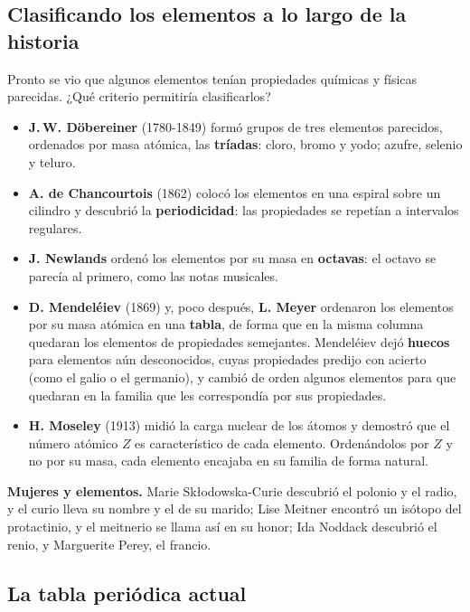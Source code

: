 \subsection{Clasificando los elementos a lo largo de la historia}

Pronto se vio que algunos elementos tenían propiedades químicas y físicas parecidas. ¿Qué criterio permitiría clasificarlos?
\begin{itemize}
    \item \textbf{J.\,W. Döbereiner} (1780-1849) formó grupos de tres elementos parecidos, ordenados por masa atómica, las
    \textbf{tríadas}: cloro, bromo y yodo; azufre, selenio y teluro.
    \item \textbf{A. de Chancourtois} (1862) colocó los elementos en una espiral sobre un cilindro y descubrió la
    \textbf{periodicidad}: las propiedades se repetían a intervalos regulares.
    \item \textbf{J. Newlands} ordenó los elementos por su masa en \textbf{octavas}: el octavo se parecía al primero, como las
    notas musicales.
    \item \textbf{D. Mendeléiev} (1869) y, poco después, \textbf{L. Meyer} ordenaron los elementos por su masa atómica en una
    \textbf{tabla}, de forma que en la misma columna quedaran los elementos de propiedades semejantes. Mendeléiev dejó
    \textbf{huecos} para elementos aún desconocidos, cuyas propiedades predijo con acierto (como el galio o el germanio), y
    cambió de orden algunos elementos para que quedaran en la familia que les correspondía por sus propiedades.
    \item \textbf{H. Moseley} (1913) midió la carga nuclear de los átomos y demostró que el número atómico \(Z\) es característico
    de cada elemento. Ordenándolos por \(Z\) y no por su masa, cada elemento encajaba en su familia de forma natural.
\end{itemize}

\begin{remark}
    \textbf{Mujeres y elementos.} Marie Skłodowska-Curie descubrió el polonio y el radio, y el curio lleva su nombre y el de su
    marido; Lise Meitner encontró un isótopo del protactinio, y el meitnerio se llama así en su honor; Ida Noddack descubrió el
    renio, y Marguerite Perey, el francio.
\end{remark}

\subsection{La tabla periódica actual}

